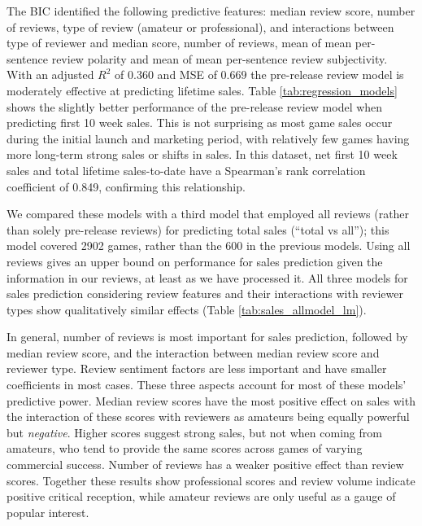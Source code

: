 \documentclass[letterpaper]{article}
\begin{document}
The BIC identified the following predictive features: median review score, number of reviews, type of review (amateur or professional), and interactions between type of reviewer and median score, number of reviews, mean of mean per-sentence review polarity and mean of mean per-sentence review subjectivity.
With an adjusted $R^2$ of $0.360$ and MSE of $0.669$ the pre-release review model is moderately effective at predicting lifetime sales. Table \ref{tab:regression_models} shows the slightly better performance of the pre-release review model when predicting first 10 week sales. This is not surprising as most game sales occur during the initial launch and marketing period, with relatively few games having more long-term strong sales or shifts in sales. In this dataset, net first 10 week sales and total lifetime sales-to-date have a Spearman's rank correlation coefficient of 0.849, confirming this relationship.

We compared these models with a third model that employed all reviews (rather than solely pre-release reviews) for predicting total sales (``total vs all''); this model covered 2902 games, rather than the 600 in the previous models. Using all reviews gives an upper bound on performance for sales prediction given the information in our reviews, at least as we have processed it. All three models for sales prediction considering review features and their interactions with reviewer types show qualitatively similar effects (Table \ref{tab:sales_allmodel_lm}). 

In general, number of reviews is most important for sales prediction, followed by median review score, and the interaction between median review score and reviewer type. Review sentiment factors are less important and have smaller coefficients in most cases. These three aspects account for most of these models' predictive power. Median review scores have the most positive effect on sales with the interaction of these scores with reviewers as amateurs being equally powerful but \textit{negative}. Higher scores suggest strong sales, but not when coming from amateurs, who tend to provide the same scores across games of varying commercial success. Number of reviews has a weaker positive effect than review scores. Together these results show professional scores and review volume indicate positive critical reception, while amateur reviews are only useful as a gauge of popular interest.
\end{document}
